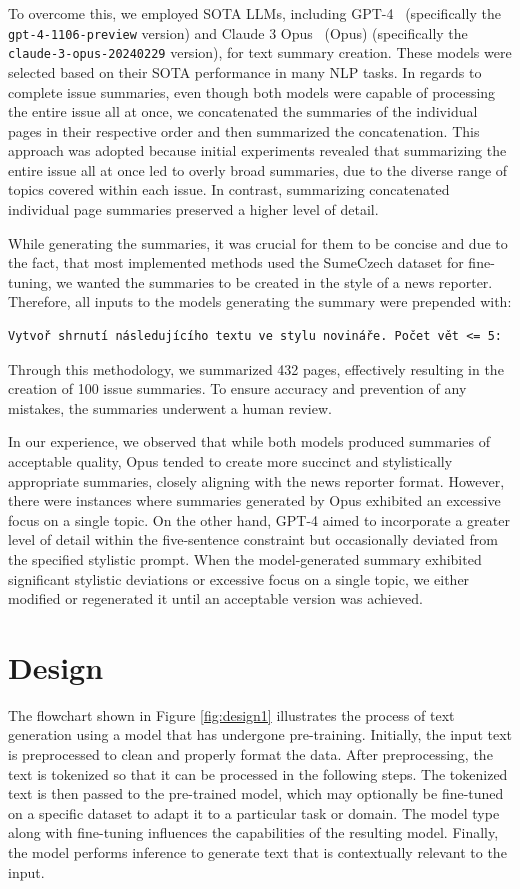 \documentclass[english, ba, kiv, he, iso690numb, pdf, viewonly]{fasthesis}
\begin{document}
To overcome this, we employed SOTA LLMs, including GPT-4~\cite{openai2024gpt4} (specifically the \texttt{gpt-4-1106-preview} version) and Claude 3 Opus~\cite{anthropic-2024} (Opus) (specifically the \texttt{claude-3-opus-20240229} version), for text summary creation. These models were selected based on their SOTA performance in many NLP tasks. In regards to complete issue summaries, even though both models were capable of processing the entire issue all at once, we concatenated the summaries of the individual pages in their respective order and then summarized the concatenation. This approach was adopted because initial experiments revealed that summarizing the entire issue all at once led to overly broad summaries, due to the diverse range of topics covered within each issue. In contrast, summarizing concatenated individual page summaries preserved a higher level of detail.

While generating the summaries, it was crucial for them to be concise and due to the fact, that most implemented methods used the SumeCzech dataset for fine-tuning, we wanted the summaries to be created in the style of a news reporter. Therefore, all inputs to the models generating the summary were prepended with:
\lstset{style=plainsrc, numbers=none, breaklines=true, 	breakatwhitespace=True,}
\begin{lstlisting}
Vytvoř shrnutí následujícího textu ve stylu novináře. Počet vět <= 5:
\end{lstlisting}
Through this methodology, we summarized 432 pages, effectively resulting in the creation of 100 issue summaries. To ensure accuracy and prevention of any mistakes, the summaries underwent a human review. 

In our experience, we observed that while both models produced summaries of acceptable quality, Opus tended to create more succinct and stylistically appropriate summaries, closely aligning with the news reporter format. However, there were instances where summaries generated by Opus exhibited an excessive focus on a single topic. On the other hand, GPT-4 aimed to incorporate a greater level of detail within the five-sentence constraint but occasionally deviated from the specified stylistic prompt. 
When the model-generated summary exhibited significant stylistic deviations or excessive focus on a single topic, we either modified or regenerated it until an acceptable version was achieved.

\section{Design}
The flowchart shown in Figure \ref{fig:design1} illustrates the process of text generation using a model that has undergone pre-training. Initially, the input text is preprocessed to clean and properly format the data. After preprocessing, the text is tokenized so that it can be processed in the following steps. The tokenized text is then passed to the pre-trained model, which may optionally be fine-tuned on a specific dataset to adapt it to a particular task or domain. The model type along with fine-tuning influences the capabilities of the resulting model. Finally, the model performs inference to generate text that is contextually relevant to the input.
\end{document}
